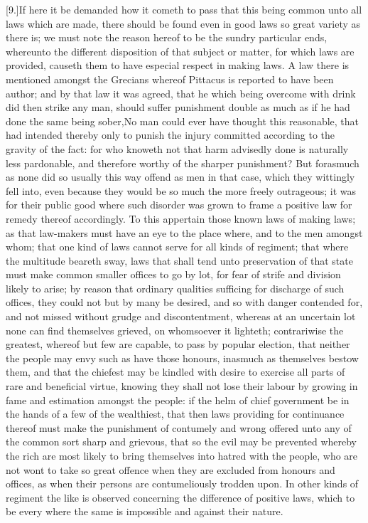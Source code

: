 [9.]If here it be demanded how it cometh to pass that this being common unto all laws which are made, there should be found even in good laws so great variety as there  is; we must note the reason hereof to be the sundry particular ends, whereunto the different disposition of that subject or matter, for which laws are provided, causeth them to have especial respect in making laws. A law there is mentioned amongst the Grecians whereof Pittacus is reported to have been author; and by that law it was agreed, that he which being overcome with drink did then strike any man, should suffer punishment double as much as if he had done the same being sober,No man could ever have thought this reasonable, that had intended thereby only to punish the injury committed according to the gravity of the fact: for who knoweth not that harm advisedly done is naturally less pardonable, and therefore worthy of the sharper punishment? But forasmuch as none did so usually this way offend as men in that case, which they wittingly fell into, even because they would be so much the more freely outrageous; it was for their public good where such disorder was grown to frame a positive law for remedy thereof accordingly. To this appertain those known laws of making laws; as that law-makers must have an eye to the place where, and to the men amongst whom; that one kind of laws cannot serve for all kinds of regiment; that where the multitude beareth sway, laws that shall tend unto preservation of that state must make common smaller offices to go by lot, for fear of strife and division likely to arise; by reason that ordinary qualities sufficing for discharge of such offices, they could not but by many be desired, and so with danger contended for, and not missed without grudge and discontentment, whereas at an uncertain lot none can find themselves grieved, on whomsoever it lighteth; contrariwise the greatest, whereof but few are capable, to pass by popular election, that neither the people may envy such as have those honours, inasmuch as themselves bestow them, and that the chiefest may be kindled with desire to exercise all parts of rare and beneficial virtue, knowing they shall not lose their labour by growing in fame and estimation amongst the people: if the helm of chief government be in the hands of a few of the wealthiest, that then laws providing for continuance thereof must make the punishment of contumely and wrong offered  unto any of the common sort sharp and grievous, that so the evil may be prevented whereby the rich are most likely to bring themselves into hatred with the people, who are not wont to take so great offence when they are excluded from honours and offices, as when their persons are contumeliously trodden upon. In other kinds of regiment the like is observed concerning the difference of positive laws, which to be every where the same is impossible and against their nature.

